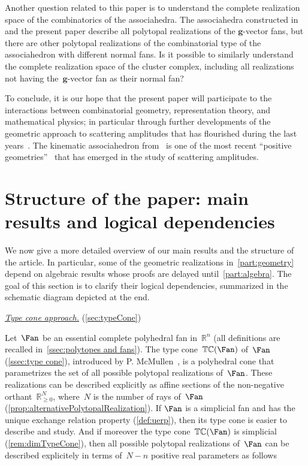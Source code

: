 \documentclass{amsart}
\theoremstyle{definition}
\newcommand{\R}{\mathbb{R}} %
\renewcommand{\b}[1]{{\boldsymbol{#1}}} %
\newcommand{\para}[1]{\medskip\noindent\uline{\textit{#1.}}} %
\newcommand{\typeCone}{\mathbb{TC}} %
\begin{document}
\smallskip
\noindent
Another question related to this paper is to understand the complete realization space of the combinatorics of the associahedra.
The associahedra constructed in~\cite{ArkaniHamedBaiHeYan, BazierMatteDouvilleMousavandThomasYildirim} and the present paper describe all polytopal realizations of the $\b{g}$-vector fans, but there are other polytopal realizations of the combinatorial type of the associahedron with different normal fans.
Is it possible to similarly understand the complete realization space of the cluster complex, including all realizations not having the~$\b{g}$-vector fan as their normal fan?

\medskip
\enlargethispage{.2cm}
To conclude, it is our hope that the present paper will participate to the interactions between combinatorial geometry, representation theory, and mathematical physics; in particular through further developments of the geometric approach to scattering amplitudes that has flourished during the last years~\cite{ArkaniHamedTrnka-Amplituhedron,ArkaniHamedBourjailyCachazoGoncharovPostnikovTrnka-GrassmannianGeometryScatteringAmplitudes}. The kinematic associahedron from~\cite{ArkaniHamedBaiHeYan} is one of the most recent ``positive geometries''~\cite{ArkaniHamedBaiLam-PositiveGeometries} that has emerged in the study of scattering amplitudes.


\section*{Structure of the paper: main results and logical dependencies}

We now give a more detailed overview of our main results and the structure of the article. In particular, some of the geometric realizations in~\cref{part:geometry} depend on algebraic results whose proofs are delayed until~\cref{part:algebra}. The goal of this section is to clarify their logical dependencies, summarized in the schematic diagram depicted at the end. 

\para{Type cone approach}
(\cref{sec:typeCone})

\noindent
Let~$\Fan$ be an essential complete polyhedral fan in~$\R^n$ (all definitions are recalled in~\cref{ssec:polytopes and fans}).
The type cone~$\typeCone(\Fan)$ of~$\Fan$ (\cref{ssec:type cone}), introduced by P. McMullen~\cite{McMullen-typeCone}, is a polyhedral cone that parametrizes the set of all possible polytopal realizations of~$\Fan$. These realizations can be described explicitly as affine sections of the non-negative orthant~$\R^N_{\geq0}$, where~$N$ is the number of rays of~$\Fan$ (\cref{prop:alternativePolytopalRealization}).  
If $\Fan$ is a simplicial fan and has the unique exchange relation property (\cref{def:uerp}), then its type cone is easier to describe and study.
And if moreover the type cone~$\typeCone(\Fan)$ is simplicial (\cref{rem:dimTypeCone}), then all possible polytopal realizations of~$\Fan$ can be described explicitely in terms of~$N-n$ positive real parameters as follows
\end{document}
